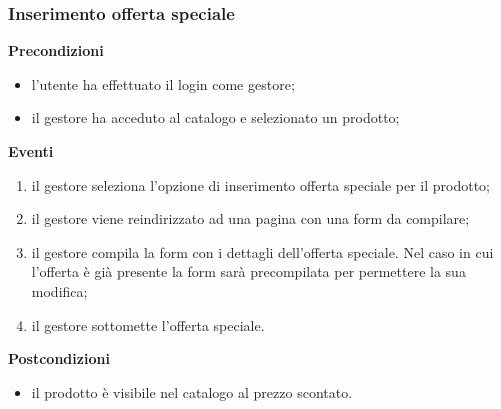 \documentclass[a4paper, 14pt]{article}
\begin{document}
\begin{flushleft}
			\bigskip
			\subsubsection{Inserimento offerta speciale}
			\textbf{Precondizioni}
			\begin{itemize}
				\item l'utente ha effettuato il login come gestore;
				\item il gestore ha acceduto al catalogo e selezionato un prodotto;
			\end{itemize}
			\textbf{Eventi}
			\begin{enumerate}
				\item il gestore seleziona l'opzione di inserimento offerta speciale per il prodotto;
				\item il gestore viene reindirizzato ad una pagina con una form da compilare;
				\item il gestore compila la form con i dettagli dell'offerta speciale. Nel caso in cui l'offerta è già presente la form sarà precompilata per permettere la sua modifica;
				\item il gestore sottomette l'offerta speciale.
			\end{enumerate}
			\textbf{Postcondizioni}
			\begin{itemize}
				\item il prodotto è visibile nel catalogo al prezzo scontato.
			\end{itemize}
		
			\bigskip

\end{flushleft}
\end{document}
